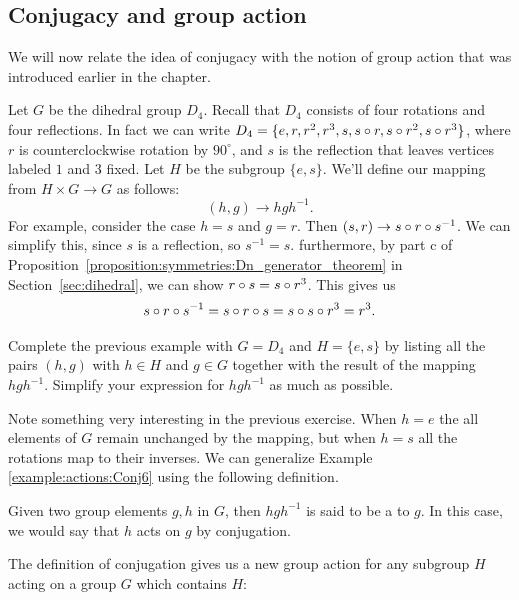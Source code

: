 \subsection{Conjugacy and group action}

We will now relate the idea of conjugacy with the notion of group action that was introduced earlier in the chapter.


\begin{example}\label{example:actions:Conj6}
Let $G$ be the dihedral group $D_4$.  Recall that $D_4$ consists of four rotations and four reflections.  In fact we can write $D_4=\{e, r, r^2, r^3, s,s\circ r,s\circ r^2,s\circ r^3\}$, where $r$ is counterclockwise rotation by $90^{\circ}$, and $s$ is the reflection that leaves vertices labeled $1$ and $3$ fixed.  Let $H$ be the subgroup $\{e,s\}$.  
We'll define our mapping from $H\times G \rightarrow G$ as follows:
$$(h,g) \rightarrow hgh^{-1}. $$
For example, consider the case $h=s$ and $g=r$. Then $(s,r) \rightarrow s\circ r \circ s^{-1}$.  We can simplify this, since $s$ is a reflection, so $s^{-1}=s$.  furthermore, by part c of Proposition~\ref{proposition:symmetries:Dn_generator_theorem}  in Section~\ref{sec:dihedral}, we can show $r\circ s =s\circ r^3$.  This gives us
$$ s\circ r\circ s^{-1}=s\circ r\circ s=s\circ s\circ r^3=r^3.$$

\end{example}
\begin{exercise}\label{exercise:actions:Conj7}
Complete the previous example with $G=D_4$ and $H=\{e,s\}$ by listing all the pairs $(h,g)$ with $h\in H$ and $g \in G$ together with the result of the mapping $hgh^{-1}$.  Simplify your expression for $hgh^{-1}$ as much as possible.
\end{exercise}
Note something very interesting in the previous exercise.  When $h=e$ the all elements of $G$ remain unchanged by the mapping, but when $h=s$ all the rotations map to their inverses.
 We can generalize Example \ref{example:actions:Conj6} using the following definition.

\begin{defn}
Given two group elements $g,h$ in $G$, then $hgh^{-1}$ is said to be a  to $g$. In this case, we would say that $h$ acts on $g$ by conjugation.
\end{defn}
The definition of conjugation gives us a new group action for any subgroup $H$ acting on a group $G$ which contains $H$:

